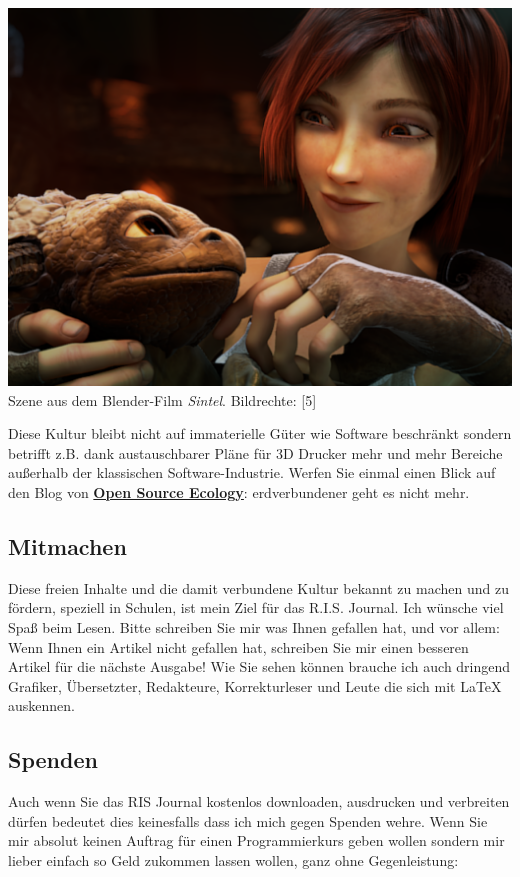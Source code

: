 \begin{center}
\includegraphics[width=\linewidth]{editoral/editoral-sintel.png}\\
\footnotesize{Szene aus dem Blender-Film \emph{Sintel}. Bildrechte: [5]}
\end{center}

Diese Kultur bleibt nicht auf immaterielle Güter wie Software beschränkt sondern betrifft z.B. dank austauschbarer Pläne für 3D Drucker mehr und mehr Bereiche außerhalb der klassischen Software-Industrie. Werfen Sie einmal einen Blick auf den Blog von \href{http://opensourceecology.org/}{\textbf{Open Source Ecology}}: erdverbundener geht es nicht mehr. 

\subsection*{Mitmachen}
Diese freien Inhalte und die damit verbundene Kultur bekannt zu machen und zu fördern, speziell in Schulen, ist mein Ziel für das R.I.S. Journal. Ich wünsche viel Spaß beim Lesen. Bitte schreiben Sie mir was Ihnen gefallen hat, und vor allem: Wenn Ihnen ein Artikel nicht gefallen hat, schreiben Sie mir einen besseren Artikel für die nächste Ausgabe! Wie Sie sehen können brauche ich auch dringend Grafiker, Übersetzter, Redakteure, Korrekturleser und Leute die sich mit {\large \LaTeX} auskennen. 

\subsection*{Spenden}
Auch wenn Sie das RIS Journal kostenlos downloaden, ausdrucken und verbreiten dürfen bedeutet dies keinesfalls dass ich mich gegen Spenden wehre. Wenn Sie mir absolut keinen Auftrag für einen Programmierkurs geben wollen sondern mir lieber einfach so Geld zukommen lassen wollen, ganz ohne Gegenleistung:


